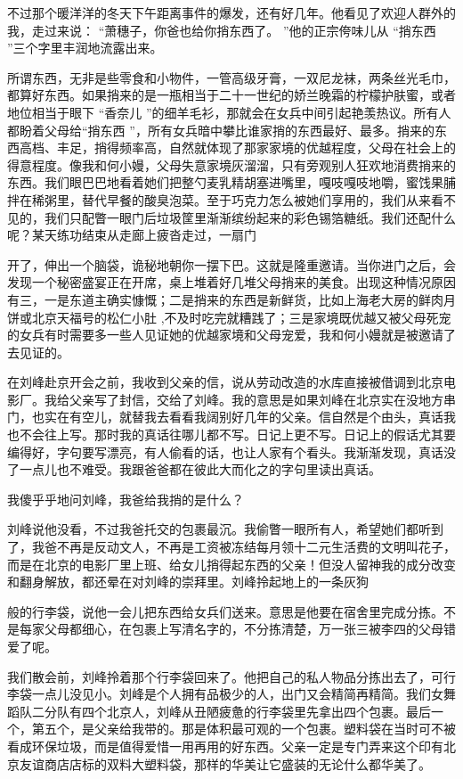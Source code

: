 \documentclass[12pt,twoside,openany]{book}
\begin{document}
不过那个暖洋洋的冬天下午距离事件的爆发，还有好几年。他看见了欢迎人群外的我，走过来说： “萧穗子，你爸也给你捎东西了。 ”他的正宗侉味儿从 “捎东西 ”三个字里丰润地流露出来。

所谓东西，无非是些零食和小物件，一管高级牙膏，一双尼龙袜，两条丝光毛巾，都算好东西。如果捎来的是一瓶相当于二十一世纪的娇兰晚霜的柠檬护肤蜜，或者地位相当于眼下 “香奈儿 ”的细羊毛衫，那就会在女兵中间引起艳羡热议。所有人都盼着父母给“捎东西 ”，所有女兵暗中攀比谁家捎的东西最好、最多。捎来的东西高档、丰足，捎得频率高，自然就体现了那家家境的优越程度，父母在社会上的得意程度。像我和何小嫚，父母失意家境灰溜溜，只有旁观别人狂欢地消费捎来的东西。我们眼巴巴地看着她们把整勺麦乳精胡塞进嘴里，嘎吱嘎吱地嚼，蜜饯果脯拌在稀粥里，替代早餐的酸臭泡菜。至于巧克力怎么被她们享用的，我们从来看不见的，我们只配瞥一眼门后垃圾筐里渐渐缤纷起来的彩色锡箔糖纸。我们还配什么呢？某天练功结束从走廊上疲沓走过，一扇门

开了，伸出一个脑袋，诡秘地朝你一摆下巴。这就是隆重邀请。当你进门之后，会发现一个秘密盛宴正在开席，桌上堆着好几堆父母捎来的美食。出现这种情况原因有三，一是东道主确实慷慨；二是捎来的东西是新鲜货，比如上海老大房的鲜肉月饼或北京天福号的松仁小肚 ,不及时吃完就糟践了；三是家境既优越又被父母死宠的女兵有时需要多一些人见证她的优越家境和父母宠爱，我和何小嫚就是被邀请了去见证的。

在刘峰赴京开会之前，我收到父亲的信，说从劳动改造的水库直接被借调到北京电影厂。我给父亲写了封信，交给了刘峰。我的意思是如果刘峰在北京实在没地方串门，也实在有空儿，就替我去看看我阔别好几年的父亲。信自然是个由头，真话我也不会往上写。那时我的真话往哪儿都不写。日记上更不写。日记上的假话尤其要编得好，字句要写漂亮，有人偷看的话，也让人家有个看头。我渐渐发现，真话没了一点儿也不难受。我跟爸爸都在彼此大而化之的字句里读出真话。

我傻乎乎地问刘峰，我爸给我捎的是什么？

刘峰说他没看，不过我爸托交的包裹最沉。我偷瞥一眼所有人，希望她们都听到了，我爸不再是反动文人，不再是工资被冻结每月领十二元生活费的文明叫花子，而是在北京的电影厂里上班、给女儿捎得起东西的父亲！但没人留神我的成分改变和翻身解放，都还晕在对刘峰的崇拜里。刘峰拎起地上的一条灰狗

般的行李袋，说他一会儿把东西给女兵们送来。意思是他要在宿舍里完成分拣。不是每家父母都细心，在包裹上写清名字的，不分拣清楚，万一张三被李四的父母错爱了呢。

我们散会前，刘峰拎着那个行李袋回来了。他把自己的私人物品分拣出去了，可行李袋一点儿没见小。刘峰是个人拥有品极少的人，出门又会精简再精简。我们女舞蹈队二分队有四个北京人，刘峰从丑陋疲惫的行李袋里先拿出四个包裹。最后一个，第五个，是父亲给我带的。那是体积最可观的一个包裹。塑料袋在当时可不被看成环保垃圾，而是值得爱惜一用再用的好东西。父亲一定是专门弄来这个印有北京友谊商店店标的双料大塑料袋，那样的华美让它盛装的无论什么都华美了。
\end{document}

